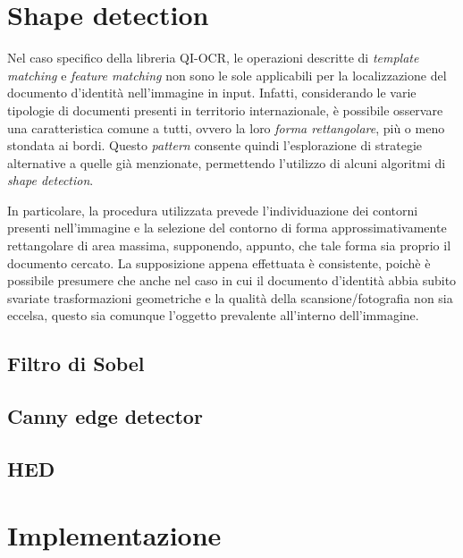 \section{Shape detection}
Nel caso specifico della libreria QI-OCR, le operazioni descritte di \textit{template matching} e \textit{feature matching} non sono le sole applicabili per la localizzazione del documento d'identit\`a nell'immagine in input. Infatti, considerando le varie tipologie di documenti presenti in territorio internazionale, \`e possibile osservare una caratteristica comune a tutti, ovvero la loro \textit{forma rettangolare}, pi\`u o meno stondata ai bordi. Questo \textit{pattern} consente quindi l'esplorazione di strategie alternative a quelle gi\`a menzionate, permettendo l'utilizzo di alcuni algoritmi di \textit{shape detection}.\par
In particolare, la procedura utilizzata prevede l'individuazione dei contorni presenti nell'immagine e la selezione del contorno di forma approssimativamente rettangolare di area massima, supponendo, appunto, che tale forma sia proprio il documento cercato. La supposizione appena effettuata \`e consistente, poich\`e \`e possibile presumere che anche nel caso in cui il documento d'identit\`a abbia subito svariate trasformazioni geometriche e la qualit\`a della scansione/fotografia non sia eccelsa, questo sia comunque l'oggetto prevalente all'interno dell'immagine.

\subsection{Filtro di Sobel}


\subsection{Canny edge detector}
\subsection{HED}


\section{Implementazione}
